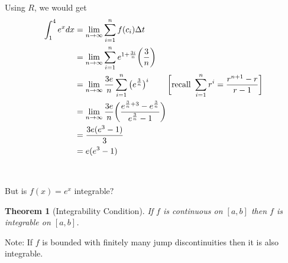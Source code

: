 \documentclass[10pt]{article}
\theoremstyle{break}
\newtheorem{thm}{Theorem}[subsection]
\begin{document}
Using $R$, we would get
\begin{align*}
    \int^4_1 e^x \space dx &= \lim_{n \to \infty} \sum^n_{i=1}f(c_i)\space \Delta t\\
    &= \lim_{n \to \infty} \sum^{n}_{i=1} e^{ \space 1 + \frac{3i}{n}} \bigg(\frac{3}{n} \bigg)\\
    &= \lim_{n \to \infty} \frac{3e}{n} \sum^n_{i=1} \big(e^{\frac{3}{n}}\big)^i \; \; \; \; \; \; \; \; \bigg[\text{recall } \sum^{n}_{i=1}r^i  = \frac{r^{n+1} - r}{r - 1}\bigg]\\
    &= \lim_{n \to \infty} \frac{3e}{n}\bigg(\frac{e^{\frac{3}{n} + 3} - e^{\frac{3}{n}}}{e^{\frac{3}{n} } - 1}\bigg)\\
    &= \frac{3e (e^3 - 1)}{3}\\
    &= e(e^3 - 1)
\end{align*} \\ \space \\
But is $f(x) = e^x $ integrable$?$
\begin{thm}[Integrability Condition]
If $f$ is continuous on $[a, b]$ then $f$ is integrable on $[a, b]$.
\end{thm}
Note: If $f$ is bounded with finitely many jump discontinuities then it is also integrable.
\end{document}
